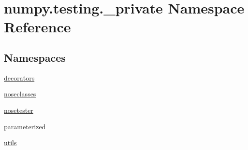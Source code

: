 \hypertarget{namespacenumpy_1_1testing_1_1__private}{}\section{numpy.\+testing.\+\_\+private Namespace Reference}
\label{namespacenumpy_1_1testing_1_1__private}
\subsection*{Namespaces}
\begin{DoxyCompactItemize}
\item 
 \hyperlink{namespacenumpy_1_1testing_1_1__private_1_1decorators}{decorators}
\item 
 \hyperlink{namespacenumpy_1_1testing_1_1__private_1_1noseclasses}{noseclasses}
\item 
 \hyperlink{namespacenumpy_1_1testing_1_1__private_1_1nosetester}{nosetester}
\item 
 \hyperlink{namespacenumpy_1_1testing_1_1__private_1_1parameterized}{parameterized}
\item 
 \hyperlink{namespacenumpy_1_1testing_1_1__private_1_1utils}{utils}
\end{DoxyCompactItemize}
